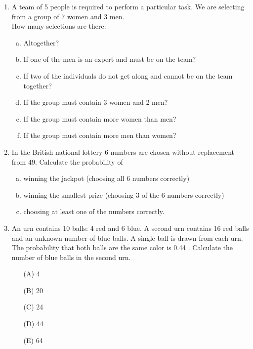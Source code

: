 \documentclass[a4paper,12pt]{article}
\begin{document}
\begin{enumerate}
\item 
	A team of 5 people is required to perform a particular task. We are selecting from a group of 7 women and 3 men.\\[0.2cm]
	How many selections are there:\\[-0.2cm]
	\begin{enumerate}[(a)]
		\item 	
	 Altogether? \item  If one of the men is an expert and must be on the team? \item If two of the individuals do not get along and cannot be on the team together? \item If the group must contain 3 women and 2 men? \item If the group must contain more women than men? \item If the group must contain more men than women?
\end{enumerate}
		\item In the British national lottery 6 numbers are chosen without replacement from 49. Calculate the probability of 
		\begin{enumerate}[(a)]
			\item		winning the jackpot (choosing all 6 numbers correctly)
		\item	winning the smallest prize (choosing 3 of the 6 numbers correctly)
		\item	choosing at least one of the numbers correctly.
	\end{enumerate}
		\item An urn contains 10 balls: 4 red and 6 blue. A second urn contains 16 red balls and an 
	unknown number of blue balls. A single ball is drawn from each urn. The probability 
	that both balls are the same color is 0.44 . 
	Calculate the number of blue balls in the second urn. 
	
	\begin{itemize}
		\item[(A)] 4 
		\item[(B)] 20 
		\item[(C)] 24 
		\item[(D)] 44 
		\item[(E)] 64
	\end{itemize}



\end{enumerate}
\end{document}
